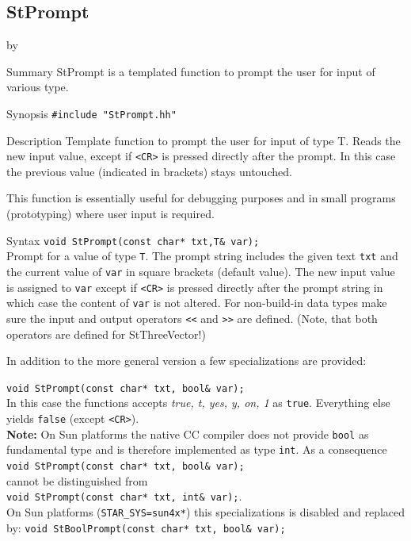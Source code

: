 \documentclass[twoside]{article}
\newcommand{\comp}[1]{\texttt{#1}}%
\newcommand{\entrylabel}[1]{\mbox{\textbf{{#1}}}\hfil}%
\newenvironment{entry}
{\begin{list}{}%
    {\renewcommand{\makelabel}{\entrylabel}%
     \setlength{\labelwidth}{90pt}%
     \setlength{\leftmargin}{\labelwidth}
     \advance\leftmargin by \labelsep%
      }%
    }%
  {\end{list}}
\newcommand{\Entrylabel}[1]%
{\raisebox{0pt}[1ex][0pt]{\makebox[\labelwidth][l]%
    {\parbox[t]{\labelwidth}{\hspace{0pt}\textbf{{#1}}}}}}
\newenvironment{Entry}%
{\renewcommand{\entrylabel}{\Entrylabel}\begin{entry}}%
  {\end{entry}}
\begin{document}
\subsection{StPrompt } \label{ref:StPrompt}
\begin{Entry}
\item[Summary]
    StPrompt is a templated function to prompt the user for input of
    various type.
    
\item[Synopsis]
    \verb+#include "StPrompt.hh"+
    
  
\item[Description]   
  Template function to prompt the user for input of type T.
  Reads the new input value, except if \verb+<CR>+ is 
  pressed directly after the prompt. In this case the
  previous value (indicated in brackets) stays untouched.

  This function is essentially useful for debugging purposes and in small
  programs (prototyping) where user input is required.
  
\item[Syntax]
    \verb+void StPrompt(const char* txt,T& var);+\\
    Prompt for a value of type \comp{T}. The prompt string includes
    the given text \comp{txt} and the current value of \comp{var}
    in square brackets (default value). The new input value is assigned
    to \comp{var} except if \verb+<CR>+ is pressed directly after the prompt
    string in which case the content of \comp{var} is not altered.
    For non-build-in data types make sure the input and output 
    operators \verb+<<+ and \verb+>>+ are defined. (Note, that 
    both operators are defined for StThreeVector!)

    In addition to the more general version a few specializations
    are provided:

    \verb+void StPrompt(const char* txt, bool& var);+\\
    In this case the functions accepts \textit{true, t, yes, y, on, 1}
    as \comp{true}. Everything else yields \comp{false}
    (except \verb+<CR>+).\\
    {\bf Note:} On Sun platforms the native CC compiler does not provide \comp{bool}
    as fundamental type and is therefore implemented as type \comp{int}.
    As a consequence \\
    \verb+void StPrompt(const char* txt, bool& var);+\\
    cannot be distinguished from \\
    \verb+void StPrompt(const char* txt, int& var);+.\\
    On Sun platforms (\comp{STAR\_SYS=sun4x*}) this specializations is
    disabled and replaced by:
    \verb+void StBoolPrompt(const char* txt, bool& var);+\\    


\end{Entry}
\end{document}
